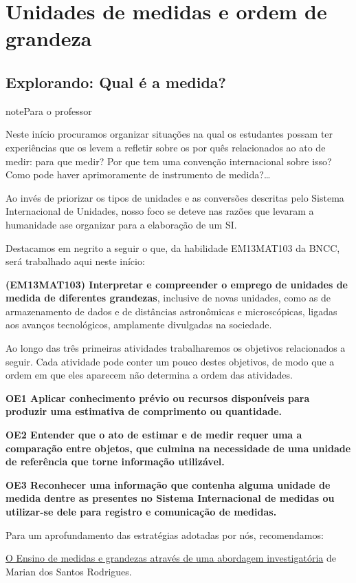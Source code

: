 \chapter{Unidades de medidas e ordem de grandeza}
\label{\detokenize{NO103::doc}}\label{\detokenize{NO103:unidades-de-medidas-e-ordem-de-grandeza}}

\section{Explorando: Qual é a medida?}
\label{\detokenize{NO103-0:explorando-qual-e-a-medida}}\label{\detokenize{NO103-0::doc}}
\begin{sphinxadmonition}{note}{Para o professor}

Neste início procuramos organizar situações na qual os estudantes possam ter experiências que os levem a refletir sobre os por quês relacionados ao ato de medir: para que medir? Por que tem uma convenção internacional sobre isso? Como pode haver aprimoramente de instrumento de medida?…

Ao invés de priorizar os tipos de unidades e as conversões descritas pelo Sistema Internacional de Unidades, nosso foco se deteve nas razões que levaram a humanidade ase organizar para a elaboração de um SI.

Destacamos em negrito a seguir o que, da habilidade EM13MAT103 da BNCC, será trabalhado aqui neste início:

\textbf{(EM13MAT103) Interpretar e compreender o emprego de unidades de medida de diferentes grandezas}, inclusive de novas unidades, como as de armazenamento de dados e de distâncias astronômicas e microscópicas, ligadas aos avanços tecnológicos, amplamente divulgadas na sociedade.

Ao longo das três primeiras atividades trabalharemos os objetivos relacionados a seguir. Cada atividade pode conter um pouco destes objetivos, de modo que a ordem em que eles aparecem não determina a ordem das atividades.

\textbf{OE1 Aplicar conhecimento prévio ou recursos disponíveis para produzir uma estimativa de comprimento ou quantidade.}

\textbf{OE2 Entender que o ato de estimar e de medir requer uma a comparação entre objetos, que culmina na necessidade de uma unidade de referência que torne informação utilizável.}

\textbf{OE3 Reconhecer uma informação que contenha alguma unidade de medida dentre as presentes no Sistema Internacional de medidas ou utilizar-se dele para registro e comunicação de medidas.}

Para um aprofundamento das estratégias adotadas por nós, recomendamos:

\href{https://repositorio.ufrn.br/jspui/bitstream/123456789/16034/1/MarianSR.pdf}{O Ensino de medidas e grandezas através de uma abordagem investigatória} de Marian dos Santos Rodrigues.
\end{sphinxadmonition}

